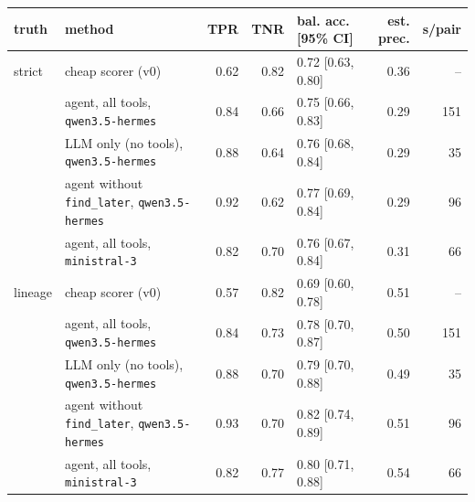 \begin{tabular}{llrrlrr}
\toprule
truth & method & TPR & TNR & bal. acc. [95\% CI] & est. prec. & s/pair \\
\midrule
strict & cheap scorer (v0) & 0.62 & 0.82 & 0.72 [0.63, 0.80] & 0.36 & -- \\
 & agent, all tools, \texttt{qwen3.5-hermes} & 0.84 & 0.66 & 0.75 [0.66, 0.83] & 0.29 & 151 \\
 & LLM only (no tools), \texttt{qwen3.5-hermes} & 0.88 & 0.64 & 0.76 [0.68, 0.84] & 0.29 & 35 \\
 & agent without \texttt{find\_later}, \texttt{qwen3.5-hermes} & 0.92 & 0.62 & 0.77 [0.69, 0.84] & 0.29 & 96 \\
 & agent, all tools, \texttt{ministral-3} & 0.82 & 0.70 & 0.76 [0.67, 0.84] & 0.31 & 66 \\
\midrule
lineage & cheap scorer (v0) & 0.57 & 0.82 & 0.69 [0.60, 0.78] & 0.51 & -- \\
 & agent, all tools, \texttt{qwen3.5-hermes} & 0.84 & 0.73 & 0.78 [0.70, 0.87] & 0.50 & 151 \\
 & LLM only (no tools), \texttt{qwen3.5-hermes} & 0.88 & 0.70 & 0.79 [0.70, 0.88] & 0.49 & 35 \\
 & agent without \texttt{find\_later}, \texttt{qwen3.5-hermes} & 0.93 & 0.70 & 0.82 [0.74, 0.89] & 0.51 & 96 \\
 & agent, all tools, \texttt{ministral-3} & 0.82 & 0.77 & 0.80 [0.71, 0.88] & 0.54 & 66 \\
\bottomrule
\end{tabular}
